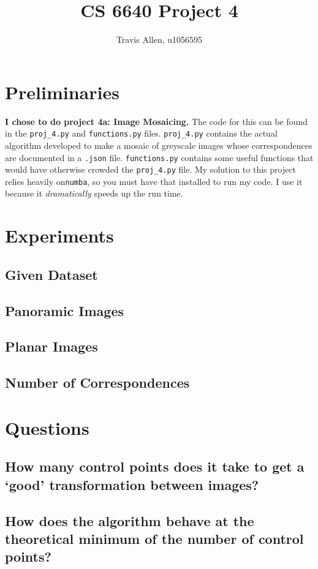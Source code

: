 \documentclass[]{article}
\title{CS 6640 Project 4}
\author{Travis Allen, u1056595}
\begin{document}
	\maketitle
	
	\newpage
	\section{Preliminaries}

	\vskip 10pt

	\textbf{I chose to do project 4a: Image Mosaicing.} The code for this can be found in the \texttt{proj\_4.py} and \texttt{functions.py} files. \texttt{proj\_4.py} contains the actual algorithm developed to make a mosaic of greyscale images whose correspondences are documented in a \texttt{.json} file. \texttt{functions.py} contains some useful functions that would have otherwise crowded the \texttt{proj\_4.py} file. My solution to this project relies heavily on\texttt{numba}, so you must have that installed to run my code. I use it because it \emph{dramatically} speeds up the run time. 

\section{Experiments}	
	\subsection{Given Dataset}
	\newpage
	\subsection{Panoramic Images}
	\subsection{Planar Images}
	\subsection{Number of Correspondences}
	\newpage
	
\section{Questions}
	\subsection{How many control points does it take to get a `good' transformation between images?}
	\subsection{How does the algorithm behave at the theoretical minimum of the number of control points?}
\end{document}
